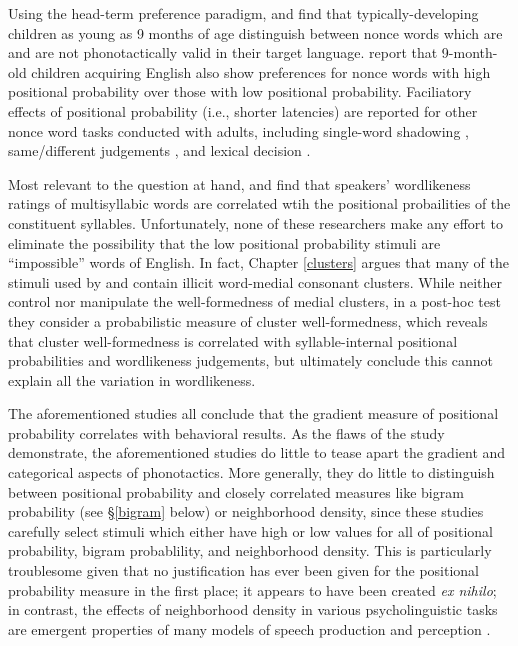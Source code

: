 Using the head-term preference paradigm, \citet{Jusczyk1993b} and \citet{Friederici1993} find that typically-developing children as young as 9 months of age distinguish between nonce words which are and are not phonotactically valid in their target language. \citet{Jusczyk1994} report that 9-month-old children acquiring English also show preferences for nonce words with high positional probability over those with low positional probability. Faciliatory effects of positional probability (i.e., shorter latencies) are reported for other nonce word tasks conducted with adults, including single-word shadowing \citep{Vitevitch1997,Vitevitch1998}, same/different judgements \citep{Vitevitch1999a,Luce2001,Lipinski2005,Vitevitch2005}, and lexical decision \citep{Pylkkanen2002a}.

Most relevant to the question at hand, \citet{Frisch2000} and \citet{Vitevitch1997} find that speakers' wordlikeness ratings of multisyllabic words are correlated wtih the positional probailities of the constituent syllables. Unfortunately, none of these researchers make any effort to eliminate the possibility that the low positional probability stimuli are ``impossible'' words of English. In fact, 
Chapter \ref{clusters} argues
that many of the stimuli used by \citeauthor{Frisch2000} and \citeauthor{Vitevitch1997} contain illicit word-medial consonant clusters. While \citeauthor{Vitevitch1997} neither control nor manipulate the well-formedness of medial clusters, in a post-hoc test they consider a probabilistic measure of cluster well-formedness, which reveals that cluster well-formedness is correlated with syllable-internal positional probabilities and wordlikeness judgements, but \citeauthor{Vitevitch1997} ultimately conclude this cannot explain all the variation in wordlikeness. 

The aforementioned studies all conclude that the gradient measure of positional probability correlates with behavioral results. As the flaws of the \citet{Vitevitch1997} study demonstrate, the aforementioned studies do little to tease apart the gradient and categorical aspects of phonotactics. More generally, they do little to distinguish between positional probability and closely correlated measures like bigram probability (see \S\ref{bigram} below) or neighborhood density, since these studies carefully select stimuli which either have high or low values for all of positional probability, bigram probablility, and neighborhood density. This is particularly troublesome given that no justification has ever been given for the positional probability measure in the first place; it appears to have been created \emph{ex nihilo}; in contrast, the effects of neighborhood density in various psycholinguistic tasks are emergent properties of many models of speech production \citep[e.g.,][]{Luce1998,Luce2000} and perception \citep{Marslen-Wilson1984,Marslen-Wilson1987,McClelland1986,Norris1994,Norris2000}. 

